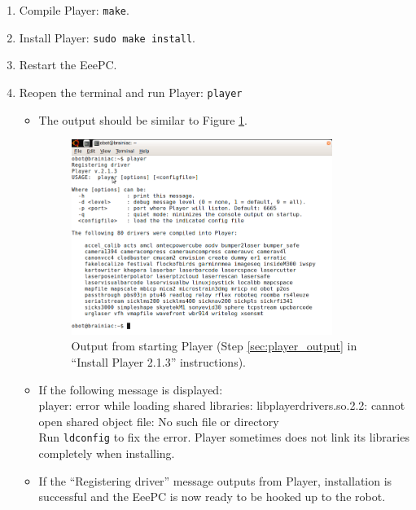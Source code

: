 \begin{enumerate}
\item Compile Player: \texttt{make}.

\item Install Player: \texttt{sudo make install}.

\item Restart the EeePC.

\item Reopen the terminal and run Player: \texttt{player} 
\begin{itemize}
\item The output should be similar to Figure \ref{fig:player_output}.
\label{sec:player_output}

\begin{figure}[!h]
\centering
\includegraphics[width=0.85\textwidth]{figures/2_player_output.png}
\caption{Output from starting Player (Step \ref{sec:player_output} in ``Install Player 2.1.3'' instructions).}
\label{fig:player_output}
\end{figure}

\item If the following message is displayed:\\

player: error while loading shared libraries: libplayerdrivers.so.2.2: cannot open shared object file: No such file or directory\\

Run \texttt{ldconfig} to fix the error. Player sometimes does not link its libraries completely when installing.

\item If the ``Registering driver'' message outputs from Player, installation is successful and the EeePC is now ready to be hooked up to the  robot.
\end{itemize}

\end{enumerate}


